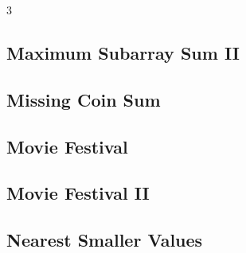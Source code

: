 \documentclass[8pt]{extarticle}
\begin{document}
\begin{multicols*}{3}
\subsection{Maximum Subarray Sum II}
\begin{caixaenunciado}

\end{caixaenunciado}
\vspace{0.3cm}


\subsection{Missing Coin Sum}
\begin{caixaenunciado}

\end{caixaenunciado}
\vspace{0.3cm}


\subsection{Movie Festival}
\begin{caixaenunciado}

\end{caixaenunciado}
\vspace{0.3cm}


\subsection{Movie Festival II}
\begin{caixaenunciado}

\end{caixaenunciado}
\vspace{0.3cm}


\subsection{Nearest Smaller Values}
\begin{caixaenunciado}

\end{caixaenunciado}
\vspace{0.3cm}



\end{multicols*}
\end{document}
